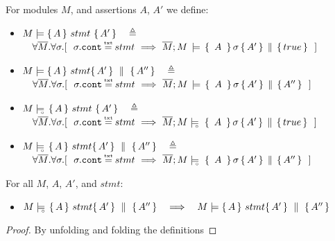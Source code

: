  \begin{definition}
For modules $M$, and assertions $A$, $A'$   we define:
\begin{itemize}
\item
\label{def:hoare:sem:one}
$M \models   \{\, A \,  \}\ stmt\  \{\, A' \, \}\ \ \ \triangleq$\\
{$\strut  \ \ \ \forall    \Mtwo. \forall  \sigma.[ \ \   %
 \sigma.\prg{cont}\txteq stmt\   \Longrightarrow \ 
{\satAssertQuadruple  \Mtwo  M   {\  A\ }  \sigma  { A'  } {true} } \ \ ]$%
}
 \item
 \label{def:hoare:sem:two}
$M \models  \{\, A \, \}\ stmt \{\, A' \, \} \, \,\parallel\,\, \{\, A'' \, \}   \ \ \  \triangleq$ \\
{$\strut  \ \ \  \forall    \Mtwo. \forall  \sigma.[ \  \  \sigma.\prg{cont}\txteq stmt\   \Longrightarrow \ 
{\satAssertQuadruple  \Mtwo  M    {\  A\ }  \sigma  { A'  } {A''} } \ \ ]$%
}
\item
\label{def:hoare:sem:three}
$M \models\!\!\!\!_{_{\circ}}\    \{\, A \,  \}\ stmt\  \{\, A' \, \}  \ \ \ \triangleq$\\
{$\strut  \ \ \ \forall    \Mtwo. \forall  \sigma.[ \ \   %
 \sigma.\prg{cont}\txteq stmt\   \Longrightarrow \ 
{\satDAssertQuadrupleFrom \Mtwo  M  \sigma   {\  A\ } { A'  } {true} } \ \ ]$%
}
 
 \item
 \label{def:hoare:sem:four}
$M \models\!\!\!\!_{_{\circ}}\   \{\, A \, \}\ stmt \{\, A' \, \} \, \,\parallel\,\, \{\, A'' \, \}    \ \ \  \triangleq$ \\
{$\strut  \ \ \  \forall    \Mtwo. \forall  \sigma.[ \ \    \sigma.\prg{cont}\txteq stmt\   \Longrightarrow \ 
{\satDAssertQuadrupleFrom \Mtwo  M  \sigma   {\  A\ } { A'  } {A''} } \ \ ]$%
}

\end{itemize}
\end{definition}



 
 \begin{lemma}
For all $M$, $A$, $A'$, and $stmt$:
\begin{itemize}
\item
$M \models\!\!\!\!_{_{\circ}}\   \{\, A \, \}\ stmt \{\, A' \, \} \, \,\parallel\,\, \{\, A'' \, \}     \ \ \ \Longrightarrow \ \ \ M \models  \{\, A \, \}\ stmt \{\, A' \, \} \, \,\parallel\,\, \{\, A'' \, \}  $
\end{itemize}
\end{lemma}
 \begin{proof}
 By unfolding and folding the definitions
 \end{proof}
 
